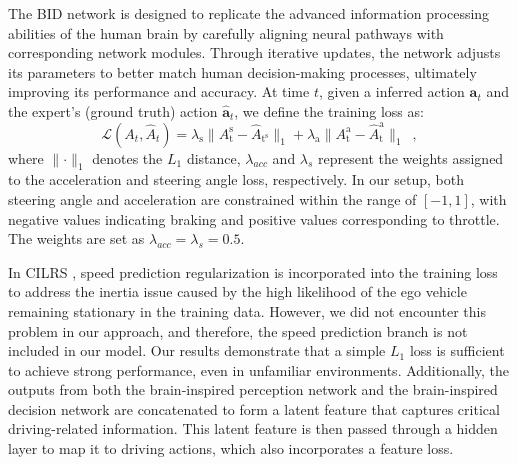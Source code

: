 \hspace{1pc}The BID network is designed to replicate the advanced information processing abilities of the human brain by carefully aligning neural pathways with corresponding network modules. 
Through iterative updates, the network adjusts its parameters to better match human decision-making processes, ultimately improving its performance and accuracy.
%
At time $t$, given a inferred action $\mathbf{a}_{t}$ and the expert's (ground truth) action $\hat{\mathbf{a}}_{t}$, we define the training loss as:
\begin{equation}\label{eq:loss}
	\mathcal{L}(A_t, \hat{A}_t) 
	= \lambda_{\text{s}} \lVert A_{\text{t}}^\text{s}-\hat{A}_{\text{t}^\text{s}} \rVert_{1}
	+ \lambda_{\text{a}}\lVert A_{\text{t}}^\text{a}-\hat{A}_{\text{t}}^\text{a}\rVert_{1} \enspace ,
\end{equation}
where $\lVert\cdot\rVert_{1}$ denotes the $L_1$ distance, $\lambda_{acc}$ and $\lambda_s$ represent the weights assigned to the acceleration and steering angle loss, respectively.
In our setup, both steering angle and acceleration are constrained within the range of $[-1, 1]$, with negative values indicating braking and positive values corresponding to throttle.
The weights are set as $\lambda_{acc} = \lambda_{s} = 0.5$. 


In CILRS \cite{Codevilla:2019}, speed prediction regularization is incorporated into the training loss to address the inertia issue caused by the high likelihood of the ego vehicle remaining stationary in the training data.
However, we did not encounter this problem in our approach, and therefore, the speed prediction branch is not included in our model.
Our results demonstrate that a simple $L_1$ loss is sufficient to achieve strong performance, even in unfamiliar environments.
%
Additionally, the outputs from both the brain-inspired perception network and the brain-inspired decision network are concatenated to form a latent feature that captures critical driving-related information. 
This latent feature is then passed through a hidden layer to map it to driving actions, which also incorporates a feature loss.


%


